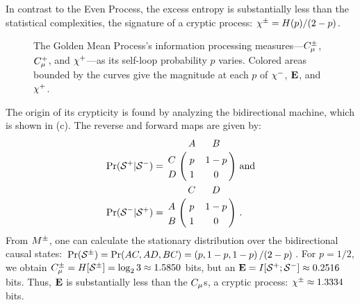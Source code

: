 In contrast to the Even Process, the excess entropy is substantially less than
the statistical complexities, the signature of a cryptic process:
$\chi^\pm = H(p)/(2-p)$.

\begin{figure}[th]
\centering
{}
\caption{The Golden Mean Process's information processing
  measures---$C_\mu^{\pm}$, $C_\mu^{+}$, and $\chi^+$---as its self-loop
  probability $p$ varies. Colored areas bounded by the curves give the
  magnitude at each $p$ of $\chi^-$, ${\bf E}$, and $\chi^+$.
  }
\label{fig:GMP_info}
\end{figure}

The origin of its crypticity is found by analyzing the bidirectional machine,
which is shown in (c). The reverse and forward maps are
given by:
\begin{align*}
\Pr(\FutureCausalState|\PastCausalState) &=
  \bordermatrix{%
      & A   & B \cr
    C & p & 1-p \cr
    D & 1   & 0
  }
  \mathrm{~and}\\
\Pr(\PastCausalState|\FutureCausalState) &=
  \bordermatrix{%
      & C   & D \cr
    A & p & 1-p \cr
    B & 1 & 0
  } ~.
\end{align*}
From ${M}^{\pm}$, one can calculate the stationary distribution over the
bidirectional causal states:
$\Pr({\mathcal{S}}^{\pm}) = \Pr(AC,AD,BC) = \left(p,1-p,1-p\right)/(2-p)$. For
$p=1/2$, we obtain $C_\mu^{\pm} = H[{\mathcal{S}}^{\pm}] = \log_2 3 \approx 1.5850$
bits, but an ${\bf E} = I[{\mathcal{S}}^{+};{\mathcal{S}}^{-}] \approx 0.2516$
bits. Thus, ${\bf E}$ is substantially less than the $C_\mu$s, a cryptic process:
$\chi^\pm \approx 1.3334$ bits.

